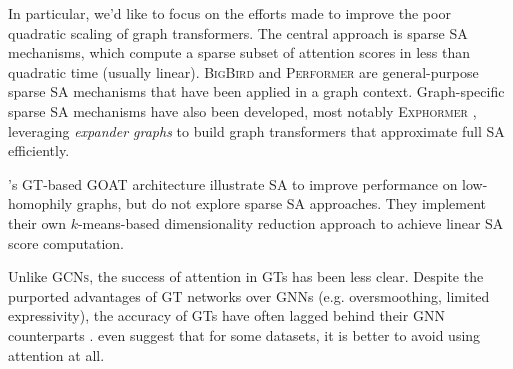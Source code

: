 In particular, we'd like to focus on the efforts made to improve
the poor quadratic scaling of graph transformers.
The central approach is sparse SA mechanisms,
which compute a sparse subset of attention scores in 
less than quadratic time (usually linear).
\textsc{BigBird} \citep{zaheer2020big}
and \textsc{Performer} \citep{choromanski2020rethinking}
are general-purpose sparse SA mechanisms
that have been applied in a graph context.
Graph-specific sparse SA mechanisms have also been developed,
most notably \textsc{Exphormer}
\citep{shirzad2023exphormer},
leveraging \emph{expander graphs}
to build graph transformers that approximate full SA
efficiently.

\citet{kong2023goat}'s GT-based \textsc{GOAT} architecture 
illustrate SA to improve performance on low-homophily graphs,
but do not explore sparse SA approaches.
They implement their own $ k $-means-based
dimensionality reduction approach to achieve linear
SA score computation.

Unlike \textsc{GCNs}, the success of 
attention in GTs has been less clear.
Despite the purported advantages of GT networks
over GNNs (e.g. oversmoothing, limited expressivity),
the accuracy of GTs have often lagged behind their
GNN counterparts \citep{shirzad2023exphormer, kong2023goat}.
\citet{shirzad2023exphormer} even suggest that for some datasets,
it is better to avoid using attention at all.
